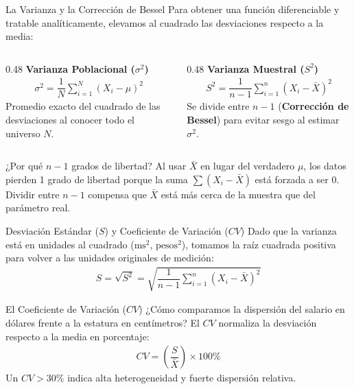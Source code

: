\documentclass[10pt,aspectratio=169]{beamer}
\begin{document}
\begin{frame}{La Varianza y la Corrección de Bessel}
  Para obtener una función diferenciable y tratable analíticamente, elevamos al cuadrado las desviaciones respecto a la media: \pause
  
  \begin{columns}[T]
    \begin{column}{0.48\textwidth}
      {\large \color{TecAzulOscuro}\textbf{Varianza Poblacional ($\sigma^2$)}}
      \vspace{0.2em}
      \begin{align}
        \sigma^2 = \dfrac{1}{N} \sum_{i=1}^{N} (X_i - \mu)^2
      \end{align}
      \small Promedio exacto del cuadrado de las desviaciones al conocer todo el universo $N$.
    \end{column}
    
    \begin{column}{0.48\textwidth}
      {\large \color{TecRojo}\textbf{Varianza Muestral ($S^2$)}}
      \vspace{0.2em}
      \begin{align}
        S^2 = \dfrac{1}{n - 1} \sum_{i=1}^{n} (X_i - \bar{X})^2
      \end{align}
      \small Se divide entre $n-1$ (\textbf{Corrección de Bessel}) para evitar sesgo al estimar $\sigma^2$.
    \end{column}
  \end{columns}
  \vspace{0.5em}
  \pause
  \begin{block}{¿Por qué $n-1$ grados de libertad?}
    Al usar $\bar{X}$ en lugar del verdadero $\mu$, los datos pierden 1 grado de libertad porque la suma $\sum(X_i - \bar{X})$ está forzada a ser 0. Dividir entre $n-1$ compensa que $\bar{X}$ está más cerca de la muestra que del parámetro real.
  \end{block}
\end{frame}

\begin{frame}{Desviación Estándar ($S$) y Coeficiente de Variación ($CV$)}
  Dado que la varianza está en unidades al cuadrado ($\text{ms}^2$, $\text{pesos}^2$), tomamos la raíz cuadrada positiva para volver a las unidades originales de medición:
  \begin{align}
    S = \sqrt{S^2} = \sqrt{\dfrac{1}{n-1} \sum_{i=1}^{n} (X_i - \bar{X})^2}
  \end{align}
  \pause
  \begin{block}{El Coeficiente de Variación ($CV$)}
    ¿Cómo comparamos la dispersión del salario en dólares frente a la estatura en centímetros? El $CV$ normaliza la desviación respecto a la media en porcentaje:
    \begin{align}
      CV = \left( \dfrac{S}{\bar{X}} \right) \times 100\%
    \end{align}
    Un $CV > 30\%$ indica alta heterogeneidad y fuerte dispersión relativa.
  \end{block}
\end{frame}
\end{document}

